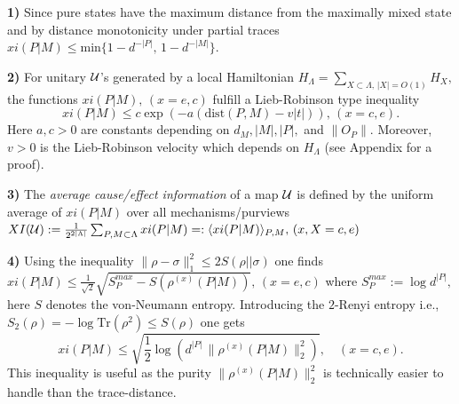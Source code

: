 \documentclass[aps,pra,groupaddress]{revtex4-1}
\begin{document}
{\bf{1)}} 
Since pure states have the maximum distance from the maximally mixed
state and by distance monotonicity under partial traces 
$xi(P|M)\le {\mathrm{min}} \{ 1-d^{-|P|},\,1- d^{-|M|}\}.$


{\bf{2)}} For  unitary $\cal U$'s generated by a local Hamiltonian $H_\Lambda=\sum_{X\subset\Lambda,\,|X|=O(1)} H_X,$ 
the functions $xi(P|M),\,(x=e,c)$ fulfill a Lieb-Robinson type 
inequality~\cite{LR} 
$$xi(P|M)\le c \exp\left( -a (\mathrm{dist}(P,M)- v|t|)\right),\, (x=c,e).$$ %
Here $a, c>0$ are constants depending on $d_M, |M|, |P|,$
and $\|O_P\|.$ Moreover, $v>0$ is the Lieb-Robinson velocity which depends on $H_\Lambda$ (see Appendix for a proof).  

{\bf{3)}} The {\em{average cause/effect information}} of a map $\cal U$ is defined by the uniform average of $xi(P|M)$ over all mechanisms/purviews
$XI({\cal U}):= \frac{1}{2^{2|\Lambda|}}\sum_{P,M\subset\Lambda} xi(P|M)=:\langle xi(P|M) \rangle_{P,M},\, (x, X=c,e)$

{\bf{4)}} Using the inequality $\|\rho-\sigma\|_1^2\le 2 S(\rho||\sigma)$ one finds 
$xi(P|M)\le \frac{1}{\sqrt{2}}\sqrt{S^{max}_P -S(\rho^{(x)}(P|M))},\,(x=e,c)$ %
where $S^{max}_P :=\log d^{|P|},$  here $S$ denotes the von-Neumann entropy. Introducing the $2$-Renyi entropy i.e., $S_2(\rho)=-\log {\mathrm{Tr}}(\rho^2)\le S(\rho) $ one gets
\begin{equation}
 xi(P|M)\le\sqrt{\frac{1}{2}\log\left(d^{|P|}\,\|\rho^{(x)}(P|M)\|_2^2\right)},\quad(x=c,e).
\label{upper-bound-cei}
\end{equation}
This inequality is useful as the purity $\|\rho^{(x)}(P|M)\|_2^2$ is technically easier to handle than the trace-distance.  
\end{document}
